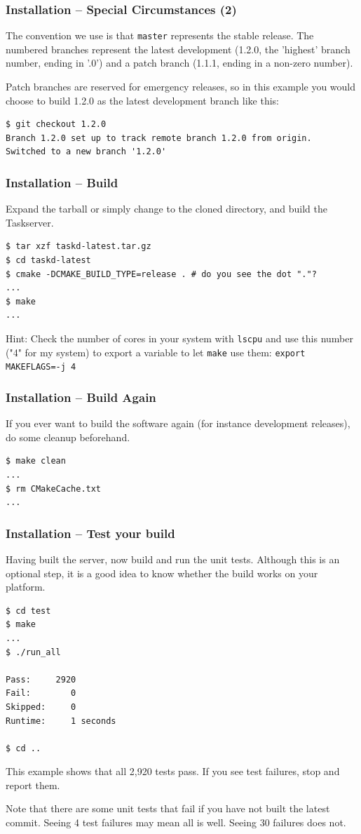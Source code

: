 \documentclass[t,handout]{beamer}
\begin{document}
\begin{frame}[fragile]\frametitle{Installation -- Special Circumstances (2)}
    \vfill
    The convention we use is that \verb+master+ represents the stable release.  The numbered branches represent the latest development (1.2.0, the 'highest' branch number, ending in '.0') and a patch branch (1.1.1, ending in a non-zero number).

    Patch branches are reserved for emergency releases, so in this example you would choose to build 1.2.0 as the latest development branch like this:

    \begin{lstlisting}
$ git checkout 1.2.0
Branch 1.2.0 set up to track remote branch 1.2.0 from origin.
Switched to a new branch '1.2.0'\end{lstlisting}
\end{frame}

\begin{frame}[fragile]\frametitle{Installation -- Build}
    \vfill
    Expand the tarball or simply change to the cloned directory, and build the Taskserver.

    \begin{lstlisting}
$ tar xzf taskd-latest.tar.gz
$ cd taskd-latest
$ cmake -DCMAKE_BUILD_TYPE=release . # do you see the dot "."?
...
$ make
...\end{lstlisting}

    Hint: Check the number of cores in your system with \verb=lscpu= and use this number ("4" for my system) to export a variable to let \verb=make= use them: \verb+export MAKEFLAGS=-j 4+
\end{frame}

\begin{frame}[fragile]\frametitle{Installation -- Build Again}
    \vfill
    If you ever want to build the software again (for instance development releases), do some cleanup beforehand.

    \begin{lstlisting}
$ make clean
...
$ rm CMakeCache.txt
...\end{lstlisting}
\end{frame}

\begin{frame}[fragile]\frametitle{Installation -- Test your build}
    Having built the server, now build and run the unit tests. Although this is an optional step, it is a good idea to know whether the build works on your platform.

    \begin{lstlisting}
$ cd test
$ make
...
$ ./run_all

Pass:     2920
Fail:        0
Skipped:     0
Runtime:     1 seconds

$ cd ..\end{lstlisting}

    This example shows that all 2,920 tests pass.  If you see test failures, stop and report them.

    Note that there are some unit tests that fail if you have not built the latest commit. Seeing 4 test failures may mean all is well. Seeing 30 failures does not.
\end{frame}
\end{document}
